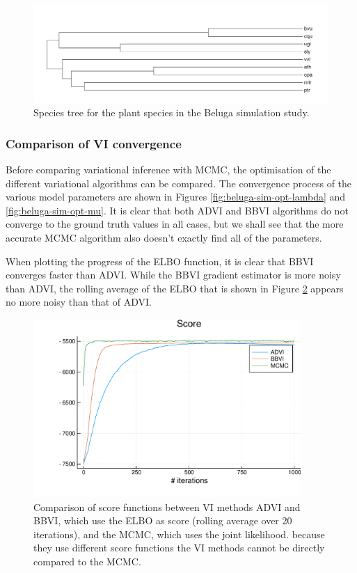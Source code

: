 \begin{figure}
	\centering
	\includegraphics[width=7in]{images/trees/plants-tree.png}
	\caption[Species tree for simulated plant data.]{Species tree for the plant species in the Beluga simulation study.}
    \label{fig:plants-tree}
\end{figure}


\subsubsection{Comparison of VI convergence}
Before comparing variational inference with MCMC, the optimisation of the different variational algorithms can be compared. The convergence process of the various model parameters are shown in Figures \ref{fig:beluga-sim-opt-lambda} and \ref{fig:beluga-sim-opt-mu}. It is clear that both ADVI and BBVI algorithms do not converge to the ground truth values in all cases, but we shall see that the more accurate MCMC algorithm also doesn't exactly find all of the parameters.

\medskip
\par When plotting the progress of the ELBO function, it is clear that BBVI converges faster than ADVI. While the BBVI gradient estimator is more noisy than ADVI, the rolling average of the ELBO that is shown in Figure \ref{fig:score} appears no more noisy than that of ADVI.

\begin{figure}
	\centering
	\includegraphics[width=4in]{images/simulations/beluga-sim-score.pdf}
	\caption[Beluga simulation: VI optimisation comparison]{Comparison of score functions between VI methods ADVI and BBVI, which use the ELBO as score (rolling average over 20 iterations), and the MCMC, which uses the joint likelihood. because they use different score functions the VI methods cannot be directly compared to the MCMC.}    
	\label{fig:score}
\end{figure}

